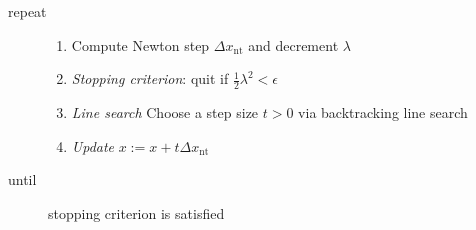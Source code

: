 \begin{itemize}
\begin{description}
        \item[repeat] \phantom{}
        \begin{enumerate}
            \item Compute Newton step $\Delta x_\mathrm{nt}$ and decrement $\lambda$
            \item \textit{Stopping criterion}: quit if $\frac{1}{2}\lambda^2<\epsilon$
            \item \textit{Line search} Choose a step size $t>0$ via backtracking line search
            \item \textit{Update} $x:=x+t\Delta x_\mathrm{nt}$
        \end{enumerate}
        \item[until] stopping criterion is satisfied
    \end{description}
\end{itemize}

